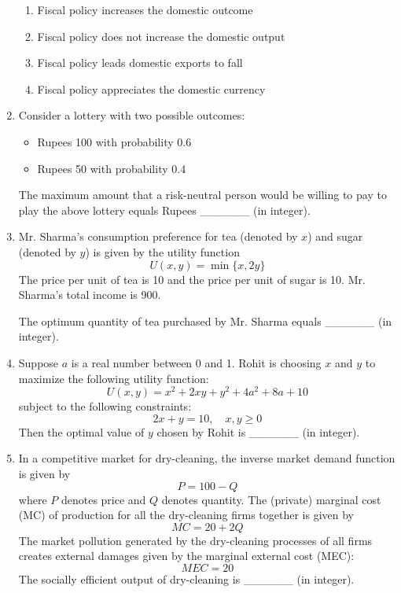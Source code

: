 \documentclass[journal,12pt,onecolumn]{exam}
\theoremstyle{remark}
\begin{document}
\begin{enumerate}
  \begin{enumerate}[label=(\Alph*)]
    \item Fiscal policy increases the domestic outcome
    \item Fiscal policy does not increase the domestic output
    \item Fiscal policy leads domestic exports to fall
    \item Fiscal policy appreciates the domestic currency
  \end{enumerate}
\vspace{2em}
  \item Consider a lottery with two possible outcomes:
  \begin{itemize}
    \item Rupees 100 with probability 0.6
    \item Rupees 50 with probability 0.4
  \end{itemize}
  The maximum amount that a risk-neutral person would be willing to pay to play the above lottery equals Rupees \_\_\_\_\_\_ (in integer).

  \vspace{2em}

  \item Mr. Sharma's consumption preference for tea (denoted by \(x\)) and sugar (denoted by \(y\)) is given by the utility function
  \[
    U(x,y) = \min \{x, 2y\}
  \]
  The price per unit of tea is 10 and the price per unit of sugar is 10. Mr. Sharma's total income is 900.

  The optimum quantity of tea purchased by Mr. Sharma equals \_\_\_\_\_\_ (in integer).

  \item Suppose \(a\) is a real number between 0 and 1. Rohit is choosing \(x\) and \(y\) to maximize the following utility function:
  \[
  U(x,y) = x^2 + 2xy + y^2 + 4a^2 + 8a + 10
  \]
  subject to the following constraints:
  \[
  2x + y = 10, \quad x,y \geq 0
  \]
  Then the optimal value of \(y\) chosen by Rohit is \_\_\_\_\_\_ (in integer).

  \item In a competitive market for dry-cleaning, the inverse market demand function is given by
  \[
  P = 100 - Q
  \]
  where \(P\) denotes price and \(Q\) denotes quantity. The (private) marginal cost (MC) of production for all the dry-cleaning firms together is given by
  \[
  MC = 20 + 2Q
  \]
  The market pollution generated by the dry-cleaning processes of all firms creates external damages given by the marginal external cost (MEC):
  \[
  MEC = 20
  \]
  The socially efficient output of dry-cleaning is \_\_\_\_\_\_ (in integer).





  









\end{enumerate}
\end{document}
